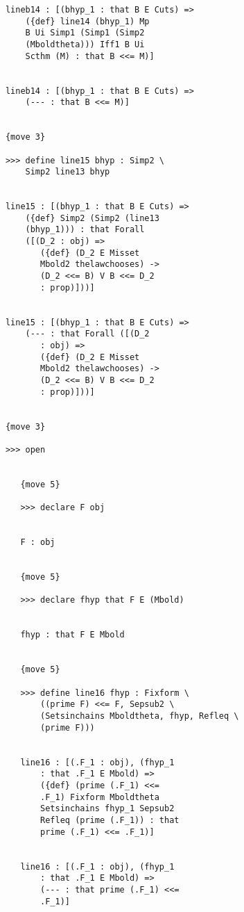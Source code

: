 \documentclass[12pt]{article}
\begin{document}
\begin{verbatim}
            lineb14 : [(bhyp_1 : that B E Cuts) => 
                ({def} line14 (bhyp_1) Mp 
                B Ui Simp1 (Simp1 (Simp2 
                (Mboldtheta))) Iff1 B Ui 
                Scthm (M) : that B <<= M)]


            lineb14 : [(bhyp_1 : that B E Cuts) => 
                (--- : that B <<= M)]


            {move 3}

            >>> define line15 bhyp : Simp2 \
                Simp2 line13 bhyp


            line15 : [(bhyp_1 : that B E Cuts) => 
                ({def} Simp2 (Simp2 (line13 
                (bhyp_1))) : that Forall 
                ([(D_2 : obj) => 
                   ({def} (D_2 E Misset 
                   Mbold2 thelawchooses) -> 
                   (D_2 <<= B) V B <<= D_2 
                   : prop)]))]


            line15 : [(bhyp_1 : that B E Cuts) => 
                (--- : that Forall ([(D_2 
                   : obj) => 
                   ({def} (D_2 E Misset 
                   Mbold2 thelawchooses) -> 
                   (D_2 <<= B) V B <<= D_2 
                   : prop)]))]


            {move 3}

            >>> open


               {move 5}

               >>> declare F obj


               F : obj


               {move 5}

               >>> declare fhyp that F E (Mbold)


               fhyp : that F E Mbold


               {move 5}

               >>> define line16 fhyp : Fixform \
                   ((prime F) <<= F, Sepsub2 \
                   (Setsinchains Mboldtheta, fhyp, Refleq \
                   (prime F)))


               line16 : [(.F_1 : obj), (fhyp_1 
                   : that .F_1 E Mbold) => 
                   ({def} (prime (.F_1) <<= 
                   .F_1) Fixform Mboldtheta 
                   Setsinchains fhyp_1 Sepsub2 
                   Refleq (prime (.F_1)) : that 
                   prime (.F_1) <<= .F_1)]


               line16 : [(.F_1 : obj), (fhyp_1 
                   : that .F_1 E Mbold) => 
                   (--- : that prime (.F_1) <<= 
                   .F_1)]



\end{verbatim}
\end{document}

